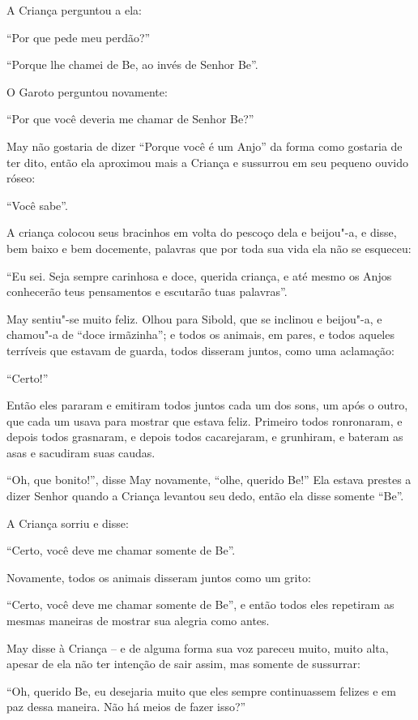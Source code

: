 A Criança perguntou a ela:

``Por que pede meu perdão?''

``Porque lhe chamei de Be, ao invés de Senhor Be''.

O Garoto perguntou novamente:

``Por que você deveria me chamar de Senhor Be?''

May não gostaria de dizer ``Porque você é um Anjo'' da forma como
gostaria de ter dito, então ela aproximou mais a Criança e sussurrou em
seu pequeno ouvido róseo:

``Você sabe''.

A criança colocou seus bracinhos em volta do pescoço dela e beijou"-a, e
disse, bem baixo e bem docemente, palavras que por toda sua vida ela não
se esqueceu:

``Eu sei. Seja sempre carinhosa e doce, querida criança, e até mesmo os
Anjos conhecerão teus pensamentos e escutarão tuas palavras''.

May sentiu"-se muito feliz. Olhou para Sibold, que se inclinou e
beijou"-a, e chamou"-a de ``doce irmãzinha''; e todos os animais, em
pares, e todos aqueles terríveis que estavam de guarda, todos disseram
juntos, como uma aclamação:

``Certo!''

Então eles pararam e emitiram todos juntos cada um dos sons, um após o
outro, que cada um usava para mostrar que estava feliz. Primeiro todos
ronronaram, e depois todos grasnaram, e depois todos cacarejaram, e
grunhiram, e bateram as asas e sacudiram suas caudas.

``Oh, que bonito!'', disse May novamente, ``olhe, querido Be!'' Ela
estava prestes a dizer Senhor quando a Criança levantou seu dedo, então
ela disse somente ``Be''.

A Criança sorriu e disse:

``Certo, você deve me chamar somente de Be''.

Novamente, todos os animais disseram juntos como um grito:

``Certo, você deve me chamar somente de Be'', e então todos eles
repetiram as mesmas maneiras de mostrar sua alegria como antes.

May disse à Criança -- e de alguma forma sua voz pareceu muito, muito
alta, apesar de ela não ter intenção de sair assim, mas somente de
sussurrar:

``Oh, querido Be, eu desejaria muito que eles sempre continuassem
felizes e em paz dessa maneira. Não há meios de fazer isso?''

